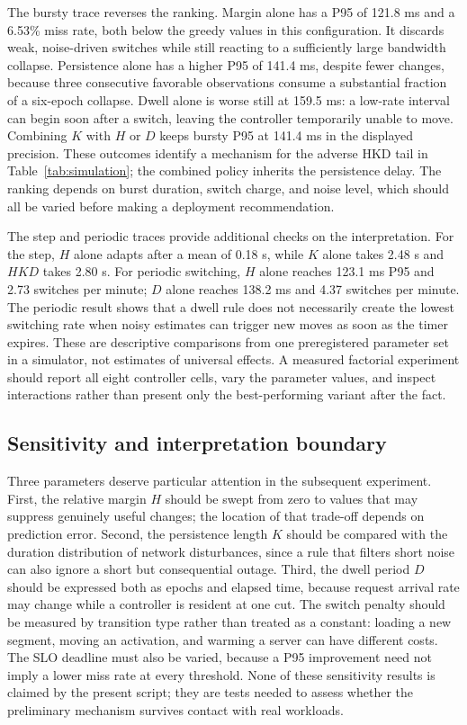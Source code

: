 \documentclass[10pt,a4paper,twocolumn]{article}
\begin{document}
The bursty trace reverses the ranking. Margin alone has a P95 of 121.8 ms and a 6.53\% miss rate, both below the greedy values in this configuration. It discards weak, noise-driven switches while still reacting to a sufficiently large bandwidth collapse. Persistence alone has a higher P95 of 141.4 ms, despite fewer changes, because three consecutive favorable observations consume a substantial fraction of a six-epoch collapse. Dwell alone is worse still at 159.5 ms: a low-rate interval can begin soon after a switch, leaving the controller temporarily unable to move. Combining $K$ with $H$ or $D$ keeps bursty P95 at 141.4 ms in the displayed precision. These outcomes identify a mechanism for the adverse HKD tail in Table~\ref{tab:simulation}; the combined policy inherits the persistence delay. The ranking depends on burst duration, switch charge, and noise level, which should all be varied before making a deployment recommendation.

The step and periodic traces provide additional checks on the interpretation. For the step, $H$ alone adapts after a mean of 0.18 s, while $K$ alone takes 2.48 s and $HKD$ takes 2.80 s. For periodic switching, $H$ alone reaches 123.1 ms P95 and 2.73 switches per minute; $D$ alone reaches 138.2 ms and 4.37 switches per minute. The periodic result shows that a dwell rule does not necessarily create the lowest switching rate when noisy estimates can trigger new moves as soon as the timer expires. These are descriptive comparisons from one preregistered parameter set in a simulator, not estimates of universal effects. A measured factorial experiment should report all eight controller cells, vary the parameter values, and inspect interactions rather than present only the best-performing variant after the fact.

\subsection{Sensitivity and interpretation boundary}
Three parameters deserve particular attention in the subsequent experiment. First, the relative margin $H$ should be swept from zero to values that may suppress genuinely useful changes; the location of that trade-off depends on prediction error. Second, the persistence length $K$ should be compared with the duration distribution of network disturbances, since a rule that filters short noise can also ignore a short but consequential outage. Third, the dwell period $D$ should be expressed both as epochs and elapsed time, because request arrival rate may change while a controller is resident at one cut. The switch penalty should be measured by transition type rather than treated as a constant: loading a new segment, moving an activation, and warming a server can have different costs. The SLO deadline must also be varied, because a P95 improvement need not imply a lower miss rate at every threshold. None of these sensitivity results is claimed by the present script; they are tests needed to assess whether the preliminary mechanism survives contact with real workloads.
\end{document}
